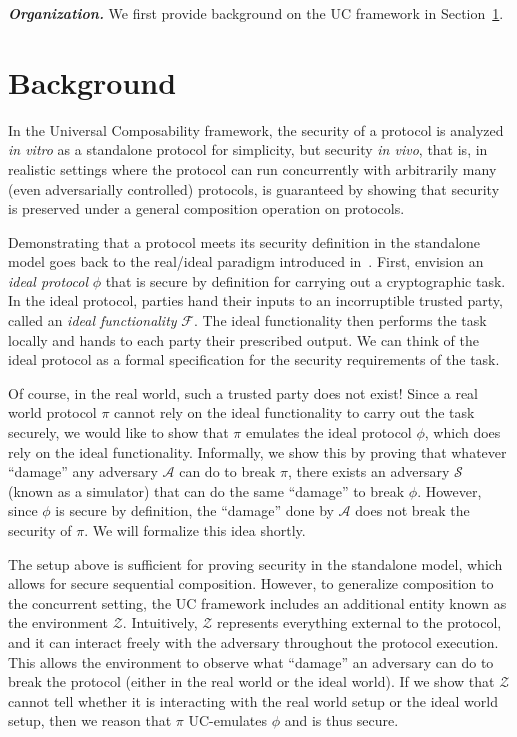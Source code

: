 \documentclass{llncs}
\newcommand{\mc}[1]{\mathcal{{#1}}}
\newcommand{\parheader}[1]{\noindent\emph{\textbf{{#1}.}}}
\begin{document}
\parheader{Organization} We first provide background on the UC framework in Section~\ref{sec:background}.

\section{Background}\label{sec:background}

In the Universal Composability framework, the security of a protocol is analyzed \emph{in vitro}
as a standalone protocol for simplicity, but security \emph{in vivo}, that is, in realistic
settings where the protocol can run concurrently with arbitrarily many (even adversarially
controlled) protocols, is guaranteed by showing that security is preserved under a
general composition operation on protocols.

Demonstrating that a protocol meets its security definition in the standalone
model goes back to the real/ideal paradigm introduced
in~\cite{goldreich1987play}. First, envision an \emph{ideal protocol} $\phi$
that is secure by definition for carrying out a cryptographic task. In the ideal
protocol, parties hand their inputs to an incorruptible trusted party, called
an \emph{ideal functionality} $\mc{F}$. The ideal functionality then performs
the task locally and hands to each party their prescribed output. We can think
of the ideal protocol as a formal specification for the security requirements of
the task.

Of course, in the real world, such a trusted party does not exist! Since a real
world protocol $\pi$ cannot rely on the ideal functionality to carry out the
task securely, we would like to show that $\pi$ emulates the ideal protocol
$\phi$, which does rely on the ideal functionality. Informally, we show this by
proving that whatever ``damage'' any adversary $\mc{A}$ can do to break $\pi$,
there exists an adversary $\mc{S}$ (known as a simulator) that can do the same
``damage'' to break $\phi$. However, since $\phi$ is secure by definition, the
``damage'' done by $\mc{A}$ does not break the security of $\pi$. We will formalize
this idea shortly.

The setup above is sufficient for proving security in the standalone model,
which allows for secure sequential composition. However, to generalize
composition to the concurrent setting, the UC framework includes an additional
entity known as the environment $\mc{Z}$. Intuitively, $\mc{Z}$ represents
everything external to the protocol, and it can interact freely with the
adversary throughout the protocol execution. This allows the environment to
observe what ``damage'' an adversary can do to break the protocol (either in the
real world or the ideal world). If we show that $\mc{Z}$ cannot tell whether it
is interacting with the real world setup or the ideal world setup, then we
reason that $\pi$ UC-emulates $\phi$ and is thus secure.
\end{document}
